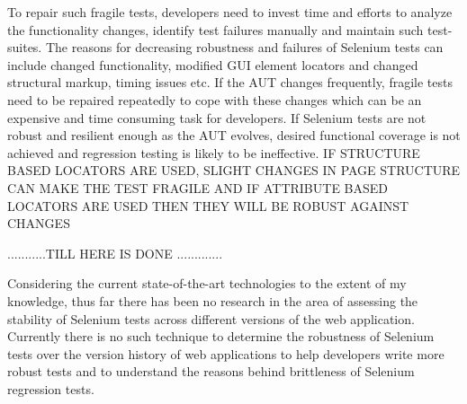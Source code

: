 To repair such fragile tests, developers need to invest time and efforts to analyze the functionality changes, identify test failures manually and maintain such test-suites. The reasons for decreasing robustness and failures of Selenium tests can include changed functionality, modified GUI element locators and changed structural markup, timing issues etc. If the AUT changes frequently, fragile tests need to be repaired repeatedly to cope with these changes which can be an expensive and time consuming task for developers. If Selenium tests are not robust and resilient enough as the AUT evolves, desired functional coverage is not achieved and regression testing is likely to be ineffective.
IF STRUCTURE BASED LOCATORS ARE USED, SLIGHT CHANGES IN PAGE STRUCTURE CAN MAKE THE TEST FRAGILE AND IF ATTRIBUTE BASED LOCATORS ARE USED THEN THEY WILL BE ROBUST AGAINST CHANGES 


...........TILL HERE IS DONE .............

Considering the current state-of-the-art technologies to the extent of my knowledge, thus far there has been no research in the area of assessing the stability of Selenium tests across different versions of the web application. Currently there is no such technique to determine the robustness of Selenium tests over the version history of web applications to help developers write more robust tests and to understand the reasons behind brittleness of Selenium regression tests. 


